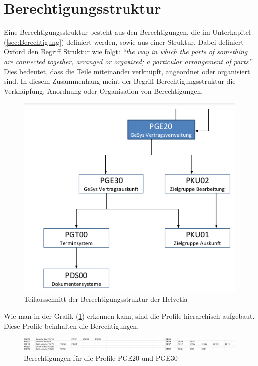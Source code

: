 \section{Berechtigungsstruktur}
\label{sec:Berechtigungsstruktur}
Eine Berechtigungsstruktur besteht aus den Berechtigungen, die im Unterkapitel (\ref{sec:Berechtigung}) definiert werden, sowie aus einer Struktur.
Dabei definiert Oxford den Begriff Struktur wie folgt:
\newline
\newline
\textit{"`the way in which the parts of something are connected together, arranged or organized; a particular arrangement of parts"'} \cite{Struct}
\newline
\newline
Dies bedeutet, dass die Teile miteinander verknüpft, angeordnet oder organisiert sind. \cite{Struct}
\newline
In diesem Zusammenhang meint der Begriff Berechtigungsstruktur die Verknüpfung, Anordnung oder Organisation von Berechtigungen.
\begin{figure}[h!]
 \centering
 \includegraphics[width=1\textwidth]{gfx/Picture/Struktur.PNG}
 \caption{Teilausschnitt der Berechtigungsstruktur der Helvetia}
 \label{fig:Teil}
\end{figure}
Wie man in der Grafik (\ref{fig:Teil}) erkennen kann, sind die Profile hierarchisch aufgebaut.
Diese Profile beinhalten die Berechtigungen.
\begin{figure}[h!]
\hspace*{-4cm}
 \centering
 \includegraphics[width=1.6\textwidth]{gfx/Picture/Ber.PNG}
 \caption{Berechtigungen für die Profile PGE$20$ und PGE$30$}
 \label{fig:Ber}
\end{figure}
